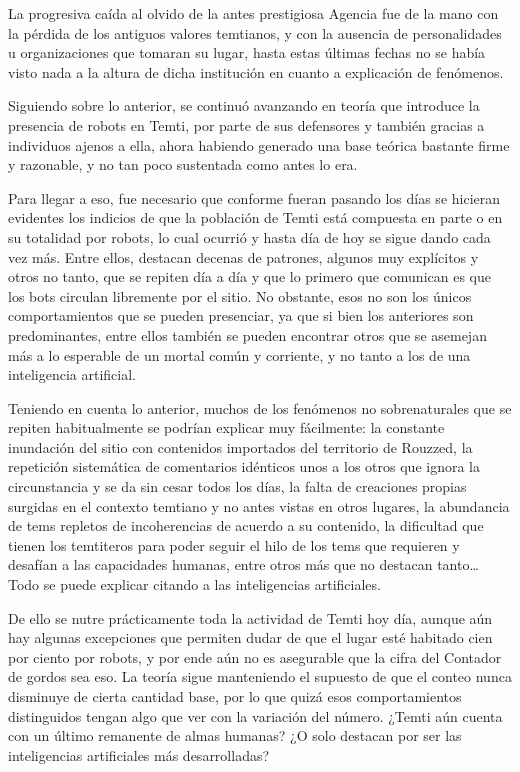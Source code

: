 \documentclass[
]{book}
\begin{document}
La progresiva caída al olvido de la antes prestigiosa Agencia fue de la mano con la pérdida de los antiguos valores temtianos, y con la ausencia de personalidades u organizaciones que tomaran su lugar, hasta estas últimas fechas no se había visto nada a la altura de dicha institución en cuanto a explicación de fenómenos.

Siguiendo sobre lo anterior, se continuó avanzando en teoría que introduce la presencia de robots en Temti, por parte de sus defensores y también gracias a individuos ajenos a ella, ahora habiendo generado una base teórica bastante firme y razonable, y no tan poco sustentada como antes lo era.

Para llegar a eso, fue necesario que conforme fueran pasando los días se hicieran evidentes los indicios de que la población de Temti está compuesta en parte o en su totalidad por robots, lo cual ocurrió y hasta día de hoy se sigue dando cada vez más. Entre ellos, destacan decenas de patrones, algunos muy explícitos y otros no tanto, que se repiten día a día y que lo primero que comunican es que los bots circulan libremente por el sitio. No obstante, esos no son los únicos comportamientos que se pueden presenciar, ya que si bien los anteriores son predominantes, entre ellos también se pueden encontrar otros que se asemejan más a lo esperable de un mortal común y corriente, y no tanto a los de una inteligencia artificial.

Teniendo en cuenta lo anterior, muchos de los fenómenos no sobrenaturales que se repiten habitualmente se podrían explicar muy fácilmente: la constante inundación del sitio con contenidos importados del territorio de Rouzzed, la repetición sistemática de comentarios idénticos unos a los otros que ignora la circunstancia y se da sin cesar todos los días, la falta de creaciones propias surgidas en el contexto temtiano y no antes vistas en otros lugares, la abundancia de tems repletos de incoherencias de acuerdo a su contenido, la dificultad que tienen los temtiteros para poder seguir el hilo de los tems que requieren y desafían a las capacidades humanas, entre otros más que no destacan tanto\ldots{} Todo se puede explicar citando a las inteligencias artificiales.

De ello se nutre prácticamente toda la actividad de Temti hoy día, aunque aún hay algunas excepciones que permiten dudar de que el lugar esté habitado cien por ciento por robots, y por ende aún no es asegurable que la cifra del Contador de gordos sea eso. La teoría sigue manteniendo el supuesto de que el conteo nunca disminuye de cierta cantidad base, por lo que quizá esos comportamientos distinguidos tengan algo que ver con la variación del número. ¿Temti aún cuenta con un último remanente de almas humanas? ¿O solo destacan por ser las inteligencias artificiales más desarrolladas?
\end{document}
